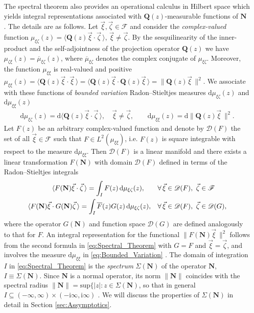 \documentclass[11pt]{amsart}
\newcommand{\I}{\mathrm{i}}
\renewcommand{\d}{\mathrm{d}}
\newcommand{\Qb}{\mathbf{Q}}
\newcommand{\Nb}{\mathbf{N}}
\newcommand{\Fs}{\mathscr{F}}
\begin{document}
The spectral theorem also provides an operational calculus in Hilbert
space which yields integral representations associated with
$\Qb(z)$-measurable functions of $\Nb$ \cite{Stone:64}. The details
are as follows. Let $\vec{\xi},\vec{\zeta}\in\Fs$ and consider the
\emph{complex-valued} function $\mu_{\xi\zeta}(z)=\langle\Qb(z)\vec{\xi}\cdot\vec{\zeta}\,\rangle$,
$\vec{\xi}\neq\vec{\zeta}$. By the sesquilinearity of the inner-product and the
self-adjointness of the projection operator $\Qb(z)$ we have
$\mu_{\zeta\xi}(z)=\overline{\mu}_{\xi\zeta}(z)$, where $\overline{\mu}_{\xi\zeta}$ denotes
the complex conjugate of $\mu_{\xi\zeta}$. Moreover, the function $\mu_{\xi\xi}$ is
real-valued and positive
$\mu_{\xi\xi}(z)=\langle\Qb(z)\vec{\xi}\cdot\vec{\xi}\,\rangle=\langle\Qb(z)\vec{\xi}\cdot\Qb(z)\vec{\xi}\,\rangle
=\|\Qb(z)\vec{\xi}\,\|^2$. We associate with these functions of
\emph{bounded variation} Radon--Stieltjes measures $\d\mu_{\xi\zeta}(z)$ and
$\d\mu_{\xi\xi}(z)$ \cite{Stone:64}   
%
\begin{align}\label{eq:Bounded_Variation}
  \d\mu_{\xi\zeta}(z)=\d\langle\Qb(z)\vec{\xi}\cdot\vec{\zeta}\,\rangle, \quad
  \vec{\xi}\neq\vec{\zeta}, \qquad
  \d\mu_{\xi\xi}(z)=\d\|\Qb(z)\vec{\xi}\,\|^2.
\end{align}
%
Let $F(z)$ be an arbitrary complex-valued function and denote by
$\mathscr{D}(F)$ the set of all $\vec{\xi}\in\Fs$ such that
$F\in L^2(\mu_{\xi\xi})$, i.e. $F(z)$ is square integrable with respect to the
measure $\d\mu_{\xi\xi}$. 
Then $\mathscr{D}(F)$ is a linear manifold and there exists a linear
transformation $F(\Nb)$ with domain $\mathscr{D}(F)$ defined in terms
of the Radon--Stieltjes integrals \cite{Stone:64} 
%
\begin{align}\label{eq:Spectral_Theorem}
  \langle F(\Nb)\vec{\xi}\cdot\vec{\zeta}\,\rangle=\int_IF(z)\,\d\mu_{\xi\zeta}(z), \qquad
  &\forall \, \vec{\xi}\in\mathscr{D}(F), \ \vec{\zeta}\in\Fs
  \\
  \langle F(\Nb)\vec{\xi}\cdot G(\Nb)\vec{\zeta}\,\rangle=\int_I\overline{F}(z)G(z)\,\d\mu_{\xi\zeta}(z),
  \quad
  &\forall \, \vec{\xi}\in\mathscr{D}(F), \ \vec{\zeta}\in\mathscr{D}(G),
  \notag
\end{align}
%
where the operator $G(\Nb)$ and function space $\mathscr{D}(G)$ are
defined analogously to that for $F$. An integral representation for
the functional $\|F(\Nb)\vec{\xi}\,\|^2$ follows from the second formula
in \eqref{eq:Spectral_Theorem} with $G=F$ and $\vec{\xi}=\vec{\zeta}$, and
involves the measure $\d\mu_{\xi\xi}$ in \eqref{eq:Bounded_Variation}
\cite{Stone:64}.  The domain of integration $I$ in
\eqref{eq:Spectral_Theorem} is the \emph{spectrum} $\Sigma(\Nb)$ of the
operator $\Nb$, $I\equiv\Sigma(\Nb)$. Since $\Nb$ is a normal operator, its norm 
$\|\Nb\|$ coincides with the spectral radius
$\|\Nb\|=\text{sup}\{|z|: z\in\Sigma(\Nb)$, so that in general
$I\subseteq(-\infty,\infty)\times(-\I\infty,\I\infty)$  \cite{Reed-1980,Stone:64}.  We will discuss the
properties of $\Sigma(\Nb)$ in detail in Section \ref{sec:Assymptotics}.  
\end{document}
